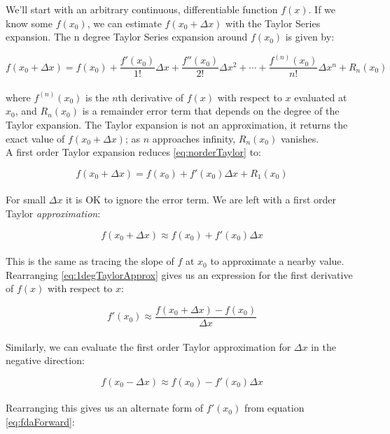 {We'll start with an arbitrary continuous, differentiable function $f(x)$.  If we know some $f(x_{0})$, we can estimate $f(x_{0}+\Delta  x)$ with the Taylor Series expansion.  The n degree Taylor Series expansion around $f(x_{0})$ is given by:

 \begin{equation}\label{eq:norderTaylor}
  f(x_{0} + \Delta  x) = f(x_{0}) + \frac{f'(x_{0})}{1!}\Delta  x + \frac{f''(x_{0})}{2!}\Delta  x^{2} + \cdots  + \frac{f^{(n)}(x_{0})}{n!}\Delta  x^{n} + R_{n}(x_{0})
  \end{equation}
    \\
  where $f^{(n)}(x_{0})$ is the $n$th derivative of $f(x)$ with respect to $x$ evaluated at $x_{0}$, and $R_{n}(x_{0})$ is a remainder error term that depends on the degree of the Taylor expansion.  The Taylor expansion is not an approximation, it returns the exact value of $ f(x_{0} + \Delta  x)$; as $n$ approaches infinity, $R_{n}(x_{0})$ vanishes.\\

A first order Taylor expansion reduces \ref{eq:norderTaylor} to:
  
 \begin{equation}\label{eq:1degTaylor}
  f(x_{0} + \Delta  x) = f(x_{0}) + f'(x_{0})\Delta x + R_{1}(x_{0})
  \end{equation}
    \\
  For small $\Delta  x$ it is OK to ignore the error term.  We are left with a first order Taylor \textit{approximation}:
  
   \begin{equation}\label{eq:1degTaylorApprox}
  f(x_{0} + \Delta  x) \approx f(x_{0}) + f'(x_{0})\Delta x
  \end{equation}
    \\
This is the same as tracing the slope of $f$ at $x_{0}$ to approximate a nearby value.  Rearranging \ref{eq:1degTaylorApprox} gives us an expression for the first derivative of $f(x)$ with respect to $x$:

 \begin{equation}\label{eq:fdaForward}
 f'(x_{0}) \approx \frac{f(x_{0} + \Delta  x) - f(x_{0})}{\Delta  x}
  \end{equation}
    \\
Similarly, we can evaluate the first order Taylor approximation for $\Delta x$ in the negative direction:

     \begin{equation}
 f(x_{0} - \Delta  x) \approx f(x_{0}) - f'(x_{0})\Delta x
  \end{equation}
    \\
  Rearranging this gives us an alternate form of $ f'(x_{0})$ from equation \ref{eq:fdaForward}:

}
